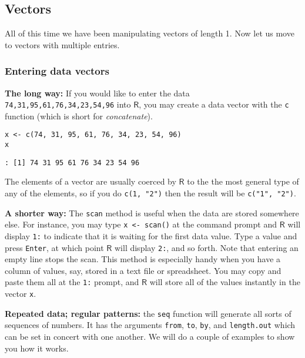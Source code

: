\subsection{Vectors}
\label{sec-2-3-3}

All of this time we have been manipulating vectors of length 1. Now
let us move to vectors with multiple entries.

\subsubsection{Entering data vectors}
\label{sec-2-3-3-1}

\textbf{The long way:}  If you would like to enter the
data \texttt{74,31,95,61,76,34,23,54,96} into \(\mathsf{R}\), you may create
a data vector with the \texttt{c} function (which is short for
\emph{concatenate}).

\begin{Verbatim}
x <- c(74, 31, 95, 61, 76, 34, 23, 54, 96)
x
\end{Verbatim}

\begin{verbatim}
: [1] 74 31 95 61 76 34 23 54 96
\end{verbatim}

The elements of a vector are usually coerced by \(\mathsf{R}\) to the
the most general type of any of the elements, so if you do \texttt{c(1, "2")}
then the result will be \texttt{c("1", "2")}.

\textbf{A shorter way:}
The \texttt{scan} method is
useful when the data are stored somewhere else. For instance, you may
type \texttt{x <- scan()} at the command prompt and \(\mathsf{R}\) will
display \texttt{1:} to indicate that it is waiting for the first data
value. Type a value and press \texttt{Enter}, at which point \(\mathsf{R}\)
will display \texttt{2:}, and so forth. Note that entering an empty line
stops the scan. This method is especially handy when you have a column
of values, say, stored in a text file or spreadsheet. You may copy and
paste them all at the \texttt{1:} prompt, and \(\mathsf{R}\) will store all
of the values instantly in the vector \texttt{x}.

\textbf{Repeated data; regular patterns:} the \texttt{seq} 
function will generate all sorts of sequences of numbers. It has the
arguments \texttt{from}, \texttt{to}, \texttt{by}, and \texttt{length.out} which can be set in
concert with one another. We will do a couple of examples to show you
how it works.

